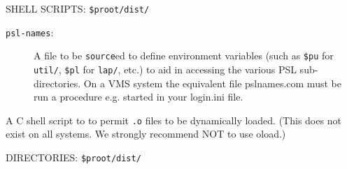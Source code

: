 \noindent
SHELL SCRIPTS: {\tt \$proot/dist/} 

\begin{description}


\item[{\tt psl-names}:]
A file to be {\tt source}ed to define environment variables (such as
{\tt \$pu} for {\tt util/}, {\tt \$pl} for {\tt lap/}, etc.) to aid in
accessing the various PSL sub-directories.
On a VMS system the equivalent file pslnames.com must be run a procedure 
e.g. started in your login.ini file.
\end{description}

\item[{\tt oload}:]
A C shell script to to permit {\tt .o} files to be dynamically loaded.  
(This does not exist on all systems. We strongly recommend NOT to use
oload.)

\noindent
DIRECTORIES: {\tt \$proot/dist/} 

